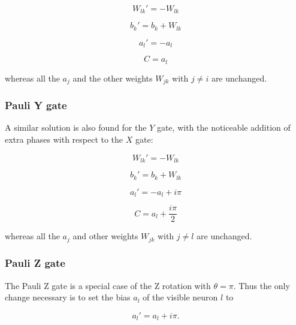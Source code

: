 \begin{equation}
   W_{lk}\prime = -W_{lk}
\end{equation}

\begin{equation}
   b_{k}\prime = b_{k} + W_{lk}
\end{equation}

\begin{equation}
   a_{l}\prime = -a_{l}
\end{equation}

\begin{equation}
   C = a_{l}
\end{equation}

whereas all the $a_{j}$ and the other weights $W_{jk}$ with $j \neq i$ are unchanged.

\subsubsection{Pauli Y gate}
A similar solution is also found for the $Y$ gate, with the noticeable addition of extra phases
with respect to the $X$ gate:

\begin{equation}
   W_{lk}\prime = -W_{lk}
\end{equation}

\begin{equation}
   b_{k}\prime = b_{k} + W_{lk}
\end{equation}

\begin{equation}
   a_{l}\prime = -a_{l} + i \pi
\end{equation}

\begin{equation}
   C = a_{l} + \frac{i \pi}{2}
\end{equation}

whereas all the $a_{j}$ and other weights $W_{jk}$ with $j \neq l$ are unchanged.

\subsubsection{Pauli Z gate}
The Pauli Z gate is a special case of the Z rotation with $\theta = \pi$. Thus the 
only change necessary is to set the bias $a_l$ of the visible neuron $l$ to

\begin{equation}
    a_{l}\prime = a_{l} + i \pi.
\end{equation}

